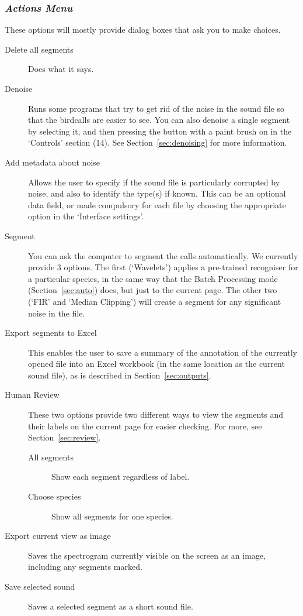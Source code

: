 \documentclass{article}
\begin{document}
\subsubsection{{\em Actions Menu}}
\label{sec:action}

These options will mostly provide dialog boxes that ask you to make choices. 

\begin{description}
\item [Delete all segments] Does what it says. 
\item [Denoise] Runs some programs that try to get rid of the noise in the sound file so that the birdcalls are easier to see. You can also denoise a single segment by selecting it, and then pressing the button with a paint brush on in the `Controls' section (14). See Section~\ref{sec:denoising} for more information.
\item [Add metadata about noise] Allows the user to specify if the sound file is particularly corrupted by noise, and also to identify the type(s) if known. This can be an optional data field, or made compulsory for each file by choosing the appropriate option in the `Interface settings'.
\item [Segment] You can ask the computer to segment the calls automatically. We currently provide 3 options. The first (`Wavelets') applies a pre-trained recogniser for a particular species, in the same way that the Batch Processing mode (Section~\ref{sec:auto}) does, but just to the current page. The other two (`FIR' and `Median Clipping') will create a segment for any significant noise in the file. 
\item [Export segments to Excel] This enables the user to save a summary of the annotation of the currently opened file into an Excel workbook (in the same location as the current sound file), as is described in Section~\ref{sec:outputs}. 
\item [Human Review] These two options provide two different ways to view the segments and their labels on the current page for easier checking. For more, see Section~\ref{sec:review}.
\begin{description}
\item[All segments] Show each segment regardless of label.
\item[Choose species] Show all segments for one species.
\end{description}
\item [Export current view as image] Saves the spectrogram currently visible on the screen as an image, including any segments marked. 
\item [Save selected sound] Saves a selected segment as a short sound file.
\end{description}
\end{document}
